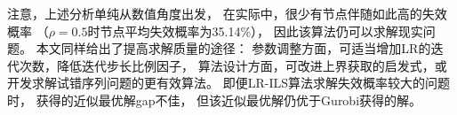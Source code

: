 注意，上述分析单纯从数值角度出发，
在实际中，很少有节点伴随如此高的失效概率
（$\rho = 0.5$时节点平均失效概率为35.14\%），
因此该算法仍可以求解现实问题。
本文同样给出了提高求解质量的途径：
参数调整方面，可适当增加LR的迭代次数，降低迭代步长比例因子，
算法设计方面，可改进上界获取的启发式，或开发求解试错序列问题的更有效算法。
即便LR-ILS算法求解失效概率较大的问题时，
获得的近似最优解gap不佳，
但该近似最优解仍优于Gurobi获得的解。
\begin{figure}[htb] %
	\centering  %
	\vspace{-0.35cm} %
	\subfigtopskip=2pt %
	\subfigbottomskip=2pt %
	\subfigcapskip=-5pt %
	\quad %

\end{figure}
